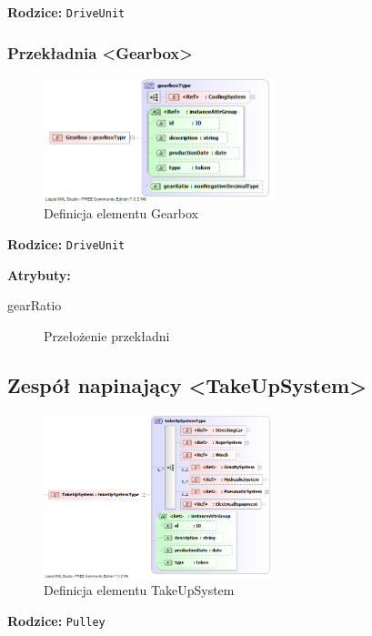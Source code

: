 \documentclass[12pt,a4paper]{article}
\begin{document}
\noindent\textbf{Rodzice:} \texttt{DriveUnit}

\subsubsection{Przekładnia <Gearbox>}

\begin{figure}[H]
  \centering
  \includegraphics[width=0.6\textwidth]{png/liquid/Gearbox}
  \caption{Definicja elementu Gearbox}
  \label{fig:gearbox-xsd}
\end{figure}

\noindent\textbf{Rodzice:} \texttt{DriveUnit}

\noindent\textbf{Atrybuty:}
\begin{description}
\item[gearRatio] Przełożenie przekładni
\end{description}


\subsection{Zespół napinający <TakeUpSystem>}

\begin{figure}[H]
  \centering
  \includegraphics[width=0.6\textwidth]{png/liquid/TakeUpSystem}
  \caption{Definicja elementu TakeUpSystem}
  \label{fig:takeUpSystem-xsd}
\end{figure}

\noindent\textbf{Rodzice:} \texttt{Pulley}
\end{document}

